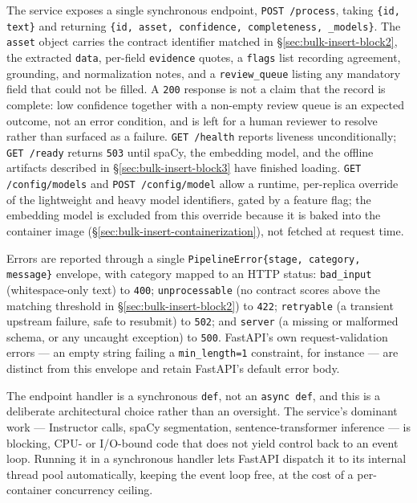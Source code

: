 The service exposes a single synchronous endpoint, \texttt{POST /process}, taking \texttt{\{id, text\}} and returning \texttt{\{id, asset, confidence, completeness, \_models\}}. The \texttt{asset} object carries the contract identifier matched in \S\ref{sec:bulk-insert-block2}, the extracted \texttt{data}, per-field \texttt{evidence} quotes, a \texttt{flags} list recording agreement, grounding, and normalization notes, and a \texttt{review\_queue} listing any mandatory field that could not be filled. A \texttt{200} response is not a claim that the record is complete: low confidence together with a non-empty review queue is an expected outcome, not an error condition, and is left for a human reviewer to resolve rather than surfaced as a failure. \texttt{GET /health} reports liveness unconditionally; \texttt{GET /ready} returns \texttt{503} until spaCy, the embedding model, and the offline artifacts described in \S\ref{sec:bulk-insert-block3} have finished loading. \texttt{GET /config/models} and \texttt{POST /config/model} allow a runtime, per-replica override of the lightweight and heavy model identifiers, gated by a feature flag; the embedding model is excluded from this override because it is baked into the container image (\S\ref{sec:bulk-insert-containerization}), not fetched at request time.

Errors are reported through a single \texttt{PipelineError\{stage, category, message\}} envelope, with category mapped to an HTTP status: \texttt{bad\_input} (whitespace-only text) to \texttt{400}; \texttt{unprocessable} (no contract scores above the matching threshold in \S\ref{sec:bulk-insert-block2}) to \texttt{422}; \texttt{retryable} (a transient upstream failure, safe to resubmit) to \texttt{502}; and \texttt{server} (a missing or malformed schema, or any uncaught exception) to \texttt{500}. FastAPI's own request-validation errors — an empty string failing a \texttt{min\_length=1} constraint, for instance — are distinct from this envelope and retain FastAPI's default error body.

The endpoint handler is a synchronous \texttt{def}, not an \texttt{async def}, and this is a deliberate architectural choice rather than an oversight. The service's dominant work — Instructor calls, spaCy segmentation, sentence-transformer inference — is blocking, CPU- or I/O-bound code that does not yield control back to an event loop. Running it in a synchronous handler lets FastAPI dispatch it to its internal thread pool automatically, keeping the event loop free, at the cost of a per-container concurrency ceiling. 

